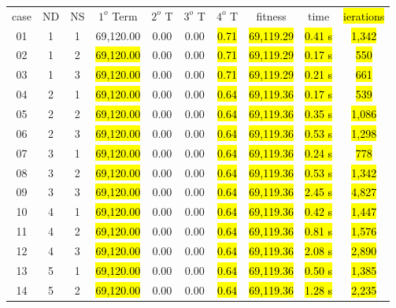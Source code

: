 \documentclass{singlecol}
\theoremstyle{TH}{
\newtheorem{lemma}{Lemma}
\newtheorem{theorem}[lemma]{Theorem}
\newtheorem{corrolary}[lemma]{Corrolary}
\newtheorem{conjecture}[lemma]{Conjecture}
\newtheorem{proposition}[lemma]{Proposition}
\newtheorem{claim}[lemma]{Claim}
\newtheorem{stheorem}[lemma]{Wrong Theorem}
\newtheorem{algorithm}{Algorithm}
}
\theoremstyle{THrm}{
\newtheorem{definition}{Definition}[section]
\newtheorem{question}{Question}[section]
\newtheorem{remark}{Remark}
\newtheorem{scheme}{Scheme}
}
\theoremstyle{THhit}{
\newtheorem{case}{Case}[section]
}
\begin{document}
\begin{table}[h!]
\begin{center}
\begin{small}
	\begin{tabular}{ c c c c c c c c c c }     
	case & ND & NS &  $1^o$ Term & $2^o$ T & $3^o$ T & $4^o$ T &  fitness  &  time  & \hl{ierations}     \\
	 01  &  1 & 1  &  69,120.00 &  0.00  & 0.00 &  \hl{0.71}   &   \hl{69,119.29}  & \hl{0.41 s} & \hl{1,342}     \\
	 02  &  1 & 2  &  \hl{69,120.00}  &  0.00  & 0.00 &  \hl{0.71}   &   \hl{69,119.29}  & \hl{0.17 s} & \hl{550}     \\
	 03  &  1 & 3  &  \hl{69,120.00}  &  0.00  & 0.00 &  \hl{0.71}   &   \hl{69,119.29}  & \hl{0.21 s} & \hl{661}     \\
	 04  &  2 & 1  & \hl{69,120.00}  &  0.00  & 0.00 &  \hl{0.64}   &   \hl{69,119.36}  & \hl{0.17 s} & \hl{539}     \\
	 05  &  2 & 2  & \hl{69,120.00}  &  0.00  & 0.00 &  \hl{0.64}   &   \hl{69,119.36}  & \hl{0.35 s} & \hl{1,086}     \\
	 06  &  2 & 3  & \hl{69,120.00}  &  0.00  & 0.00 &  \hl{0.64}   &   \hl{69,119.36}  & \hl{0.53 s} & \hl{1,298}     \\
	 07  &  3 & 1  & \hl{69,120.00}  &  0.00  & 0.00 &  \hl{0.64}   &   \hl{69,119.36}  & \hl{0.24 s} & \hl{778}     \\
	 08  &  3 & 2  & \hl{69,120.00}  &  0.00 & 0.00 &  \hl{0.64}   &   \hl{69,119.36}  & \hl{0.53 s} & \hl{1,342}     \\
	 09  &  3 & 3  & \hl{69,120.00}  &  0.00  & 0.00 &  \hl{0.64}   &   \hl{69,119.36}  & \hl{2.45 s} & \hl{4,827}     \\
	 10  &  4 & 1  & \hl{69,120.00}  & 0.00  & 0.00 &  \hl{0.64}   &   \hl{69,119.36}  & \hl{0.42 s} & \hl{1,447}     \\
	 11  &  4 & 2  & \hl{69,120.00}  & 0.00  & 0.00 &  \hl{0.64}   &   \hl{69,119.36}  & \hl{0.81 s} & \hl{1,576}     \\
	 12  &  4 & 3  & \hl{69,120.00}  &  0.00  & 0.00 &  \hl{0.64}   &   \hl{69,119.36}  & \hl{2.08 s} & \hl{2,890}     \\
	 13  &  5 & 1  & \hl{69,120.00}  &  0.00  & 0.00 &  \hl{0.64}   &   \hl{69,119.36}  & \hl{0.50 s} & \hl{1,385}     \\
	 14  &  5 & 2  & \hl{69,120.00}  &  0.00 & 0.00 &  \hl{0.64}   &   \hl{69,119.36}  & \hl{1.28 s} & \hl{2,235}     \\

\end{tabular}
\end{small}
\end{center}
\end{table}
\end{document}
